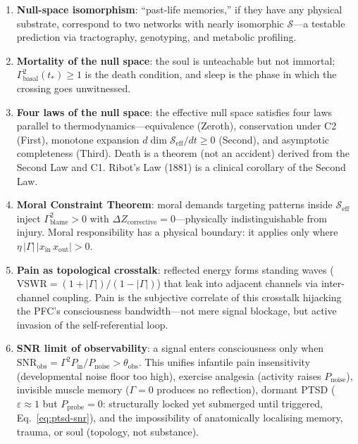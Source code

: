 \documentclass[aps,pre,twocolumn,superscriptaddress,floatfix]{revtex4-2}
\begin{document}
\begin{enumerate}
    is the physical substrate of intuition.
  \item \textbf{Null-space isomorphism}:
    ``past-life memories,'' if they have any physical
    substrate, correspond to two networks with nearly
    isomorphic $\mathcal{S}$---a testable prediction
    via tractography, genotyping, and metabolic profiling.
  \item \textbf{Mortality of the null space}:
    the soul is unteachable but not immortal;
    $\Gamma_{\text{basal}}^2(t_*)\ge 1$ is the death
    condition, and sleep is the phase in which the
    crossing goes unwitnessed.
  \item \textbf{Four laws of the null space}:
    the effective null space satisfies four laws
    parallel to thermodynamics---equivalence (Zeroth),
    conservation under C2 (First),
    monotone expansion $d\dim\mathcal{S}_{\text{eff}}/dt\ge 0$
    (Second), and asymptotic completeness (Third).
    Death is a theorem (not an accident) derived from the
    Second Law and C1.
    Ribot's Law (1881) is a clinical corollary of the
    Second Law.
  \item \textbf{Moral Constraint Theorem}:
    moral demands targeting patterns inside
    $\mathcal{S}_{\text{eff}}$ inject
    $\Gamma^2_{\text{blame}}>0$ with
    $\Delta Z_{\text{corrective}}=0$---physically
    indistinguishable from injury.
    Moral responsibility has a physical boundary:
    it applies only where
    $\eta\,|\Gamma|\,|x_{\text{in}}\,x_{\text{out}}|>0$.
  \item \textbf{Pain as topological crosstalk}:
    reflected energy forms standing waves
    ($\mathrm{VSWR} = (1+|\Gamma|)/(1-|\Gamma|)$)
    that leak into adjacent channels via
    inter-channel coupling.
    Pain is the subjective correlate of this
    crosstalk hijacking the PFC's consciousness
    bandwidth---not mere signal blockage, but
    active invasion of the self-referential loop.
  \item \textbf{SNR limit of observability}:
    a signal enters consciousness only when
    $\mathrm{SNR}_{\text{obs}} =
    \Gamma^2 P_{\text{in}} / P_{\text{noise}} >
    \theta_{\text{obs}}$.
    This unifies infantile pain insensitivity
    (developmental noise floor too high),
    exercise analgesia (activity raises
    $P_{\text{noise}}$), invisible muscle memory
    ($\Gamma = 0$ produces no reflection),
    dormant PTSD ($\varepsilon \approx 1$ but
    $P_{\text{probe}} = 0$: structurally locked
    yet submerged until triggered,
    Eq.~\ref{eq:ptsd-snr}),
    and the impossibility of anatomically
    localising memory, trauma, or soul
    (topology, not substance).
\end{enumerate}
\end{document}

